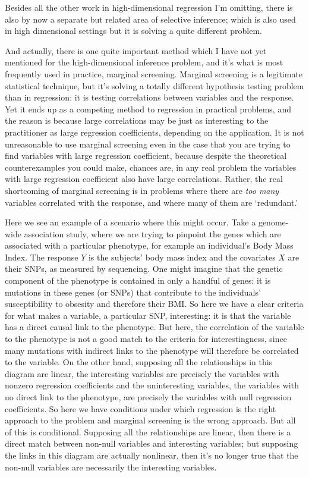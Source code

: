 \documentclass[11pt]{article}
\begin{document}
Besides all the other work in high-dimensional regression I'm
omitting, there is also by now a separate but related area of
selective inference; which is also used in high dimensional settings
but it is solving a quite different problem.

And actually, there is one quite important method which I have not yet
mentioned for the high-dimensional inference problem, and it's what is
most frequently used in practice, marginal screening.  Marginal
screening is a legitimate statistical technique, but it's solving a
totally different hypothesis testing problem than in regression: it is
testing correlations between variables and the response. Yet it ends
up as a competing method to regression in practical problems, and the
reason is because large correlations may be just as interesting to the
practitioner as large regression coefficients, depending on the
application.  It is not unreasonable to use marginal screening even in
the case that you are trying to find variables with large regression
coefficient, because despite the theoretical counterexamples you could
make, chances are, in any real problem the variables with large
regression coefficient also have large correlations.  Rather, the real
shortcoming of marginal screening is in problems where there are
\emph{too many} variables correlated with the response, and where many
of them are `redundant.'

Here we see an example of a scenario where this might occur.  Take a
genome-wide association study, where we are trying to pinpoint the
genes which are associated with a particular phenotype, for example an
individual's Body Mass Index.  The response $Y$ is the subjects' body
mass index and the covariates $X$ are their SNPs, as measured by
sequencing.  One might imagine that the genetic component of the
phenotype is contained in only a handful of genes: it is mutations in
these genes (or SNPs) that contribute to the individuals'
susceptibility to obsesity and therefore their BMI.  So here we have a
clear criteria for what makes a variable, a particular SNP,
interesting: it is that the variable has a direct causal link to the
phenotype.  But here, the correlation of the variable to the phenotype
is not a good match to the criteria for interestingness, since many
mutations with indirect links to the phenotype will therefore be
correlated to the variable.  On the other hand, supposing all the
relationships in this diagram are linear, the interesting variables
are precisely the variables with nonzero regression coefficients and
the uninteresting variables, the variables with no direct link to the
phenotype, are precisely the variables with null regression
coefficients.  So here we have conditions under which regression is
the right approach to the problem and marginal screening is the wrong
approach.  But all of this is conditional.  Supposing all the
relationships are linear, then there is a direct match between
non-null variables and interesting variables; but supposing the links
in this diagram are actually nonlinear, then it's no longer true that
the non-null variables are necessarily the interesting variables.
\end{document}
